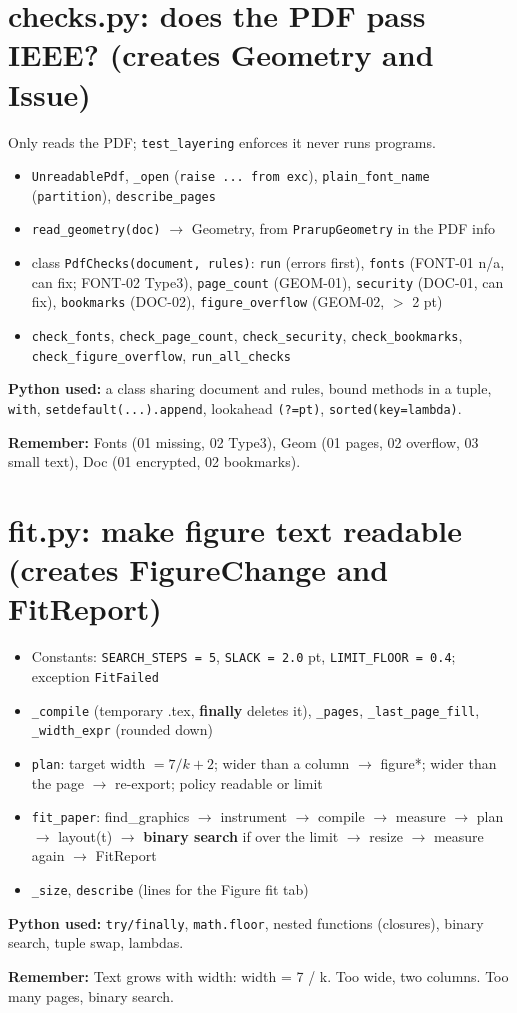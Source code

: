 \documentclass[10.5pt,a4paper]{article}
\newcommand{\cc}[1]{\texttt{#1}}
\newcommand{\remember}[1]{\par\smallskip\noindent\colorbox{soft}{\parbox{\dimexpr\linewidth-2\fboxsep}{\textbf{\color{slate}Remember:} #1}}\par\smallskip}
\begin{document}
\section{checks.py: does the PDF pass IEEE? (creates Geometry and Issue)}
Only reads the PDF; \cc{test\_layering} enforces it never runs programs.
\begin{itemize}
\item \cc{UnreadablePdf}, \cc{\_open} (\cc{raise ... from exc}), \cc{plain\_font\_name} (\cc{partition}), \cc{describe\_pages}
\item \cc{read\_geometry(doc)} \(\rightarrow\) Geometry, from \cc{PrarupGeometry} in the PDF info
\item class \cc{PdfChecks(document, rules)}: \cc{run} (errors first), \cc{fonts} (FONT-01 n/a, can fix; FONT-02 Type3), \cc{page\_count} (GEOM-01), \cc{security} (DOC-01, can fix), \cc{bookmarks} (DOC-02), \cc{figure\_overflow} (GEOM-02, \(>\) 2 pt)
\item \cc{check\_fonts}, \cc{check\_page\_count}, \cc{check\_security}, \cc{check\_bookmarks}, \cc{check\_figure\_overflow}, \cc{run\_all\_checks}
\end{itemize}
\textbf{Python used:} a class sharing document and rules, bound methods in a tuple, \cc{with}, \cc{setdefault(...).append}, lookahead \cc{(?=pt)}, \cc{sorted(key=lambda)}.
\remember{Fonts (01 missing, 02 Type3), Geom (01 pages, 02 overflow, 03 small text), Doc (01 encrypted, 02 bookmarks).}

\section{fit.py: make figure text readable (creates FigureChange and FitReport)}
\begin{itemize}
\item Constants: \cc{SEARCH\_STEPS = 5}, \cc{SLACK = 2.0} pt, \cc{LIMIT\_FLOOR = 0.4}; exception \cc{FitFailed}
\item \cc{\_compile} (temporary .tex, \textbf{finally} deletes it), \cc{\_pages}, \cc{\_last\_page\_fill}, \cc{\_width\_expr} (rounded down)
\item \cc{plan}: target width \(= 7/k + 2\); wider than a column \(\rightarrow\) figure*; wider than the page \(\rightarrow\) re-export; policy readable or limit
\item \cc{fit\_paper}: find\_graphics \(\rightarrow\) instrument \(\rightarrow\) compile \(\rightarrow\) measure \(\rightarrow\) plan \(\rightarrow\) layout(t) \(\rightarrow\) \textbf{binary search} if over the limit \(\rightarrow\) resize \(\rightarrow\) measure again \(\rightarrow\) FitReport
\item \cc{\_size}, \cc{describe} (lines for the Figure fit tab)
\end{itemize}
\textbf{Python used:} \cc{try/finally}, \cc{math.floor}, nested functions (closures), binary search, tuple swap, lambdas.
\remember{Text grows with width: width = 7 / k. Too wide, two columns. Too many pages, binary search.}
\end{document}
